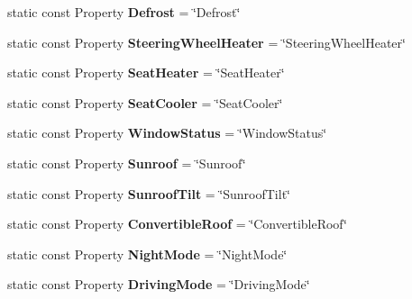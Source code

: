 \begin{DoxyCompactItemize}
\item 
\hypertarget{classVehicleProperty_a1f1ade6fb94a977e8dbc31b3a90b1cc3}{static const Property {\bfseries Defrost} = \char`\"{}Defrost\char`\"{}}\label{classVehicleProperty_a1f1ade6fb94a977e8dbc31b3a90b1cc3}

\item 
\hypertarget{classVehicleProperty_a50ba22b48049e141acfd9c24549573c2}{static const Property {\bfseries Steering\-Wheel\-Heater} = \char`\"{}Steering\-Wheel\-Heater\char`\"{}}\label{classVehicleProperty_a50ba22b48049e141acfd9c24549573c2}

\item 
\hypertarget{classVehicleProperty_aaf891a6fb7485be67ab8dfae96636076}{static const Property {\bfseries Seat\-Heater} = \char`\"{}Seat\-Heater\char`\"{}}\label{classVehicleProperty_aaf891a6fb7485be67ab8dfae96636076}

\item 
\hypertarget{classVehicleProperty_aa5ccd72b6b86bd1741d05281fb0490c6}{static const Property {\bfseries Seat\-Cooler} = \char`\"{}Seat\-Cooler\char`\"{}}\label{classVehicleProperty_aa5ccd72b6b86bd1741d05281fb0490c6}

\item 
\hypertarget{classVehicleProperty_aafce44d9eb4eb200970bf1146cdd77d3}{static const Property {\bfseries Window\-Status} = \char`\"{}Window\-Status\char`\"{}}\label{classVehicleProperty_aafce44d9eb4eb200970bf1146cdd77d3}

\item 
\hypertarget{classVehicleProperty_ae7498970718f7bf52ef6a5800084b91b}{static const Property {\bfseries Sunroof} = \char`\"{}Sunroof\char`\"{}}\label{classVehicleProperty_ae7498970718f7bf52ef6a5800084b91b}

\item 
\hypertarget{classVehicleProperty_aaa5b7fe1aa9c1df58285370a2223a9a7}{static const Property {\bfseries Sunroof\-Tilt} = \char`\"{}Sunroof\-Tilt\char`\"{}}\label{classVehicleProperty_aaa5b7fe1aa9c1df58285370a2223a9a7}

\item 
\hypertarget{classVehicleProperty_ac81ed60b4ae5140288191380470aa6fe}{static const Property {\bfseries Convertible\-Roof} = \char`\"{}Convertible\-Roof\char`\"{}}\label{classVehicleProperty_ac81ed60b4ae5140288191380470aa6fe}

\item 
\hypertarget{classVehicleProperty_af85dc0e35b81d1ce30818c0dc2cbde94}{static const Property {\bfseries Night\-Mode} = \char`\"{}Night\-Mode\char`\"{}}\label{classVehicleProperty_af85dc0e35b81d1ce30818c0dc2cbde94}

\item 
\hypertarget{classVehicleProperty_a4b68af6a7539a07a2be7438bd6ced9f0}{static const Property {\bfseries Driving\-Mode} = \char`\"{}Driving\-Mode\char`\"{}}\label{classVehicleProperty_a4b68af6a7539a07a2be7438bd6ced9f0}

\end{DoxyCompactItemize}


